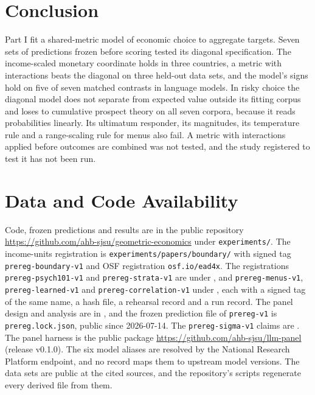 \documentclass[journal]{IEEEtran}
\begin{document}
\section{Conclusion}

Part I fit a shared-metric model of economic choice to aggregate targets.
Seven sets of predictions frozen before scoring tested its diagonal specification.
The income-scaled monetary coordinate holds in three countries, a metric with interactions beats the diagonal on three held-out data sets, and the model's signs hold on five of seven matched contrasts in language models.
In risky choice the diagonal model does not separate from expected value outside its fitting corpus and loses to cumulative prospect theory on all seven corpora, because it reads probabilities linearly.
Its ultimatum responder, its magnitudes, its temperature rule and a range-scaling rule for menus also fail.
A metric with interactions applied before outcomes are combined was not tested, and the study registered to test it has not been run.

\section*{Data and Code Availability}
\sloppy
Code, frozen predictions and results are in the public repository \url{https://github.com/ahb-sjsu/geometric-economics} under \texttt{experiments/}.
The income-units registration is \texttt{experiments/papers/boundary/} with signed tag \texttt{prereg-boundary-v1} and OSF registration \texttt{osf.io/ead4x}. %
The registrations \texttt{prereg-psych101-v1} and \texttt{prereg-strata-v1} are under , and \texttt{prereg-menus-v1}, \texttt{prereg-learned-v1} and \texttt{prereg-correlation-v1} under , each with a signed tag of the same name, a hash file, a rehearsal record and a run record.
The panel design and analysis are in , and the frozen prediction file of \texttt{prereg-v1} is \texttt{prereg.lock.json}, public since 2026-07-14.
The \texttt{prereg-sigma-v1} claims are .
The panel harness is the public package \url{https://github.com/ahb-sjsu/llm-panel} (release v0.1.0).
The six model aliases are resolved by the National Research Platform endpoint, and no record maps them to upstream model versions.
The data sets are public at the cited sources, and the repository's scripts regenerate every derived file from them.
\end{document}
